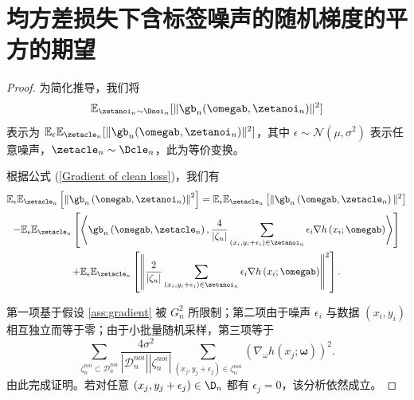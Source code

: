 \section{均方差损失下含标签噪声的随机梯度的平方的期望}\label{app:pro2}
\begin{proof}
为简化推导，我们将
$$
\mathbb{E}_{\zetanoi_n\sim \Dnoi_n}[\Vert \gb_n(\omegab, \zetanoi_n) \Vert^2]
$$
表示为 $\mathbb{E}_\epsilon\mathbb{E}_{\zetacle_n}[\Vert \gb_n(\omegab, \zetanoi_n) \Vert^2]$，其中 $\epsilon\sim \mathcal{N}(\mu, \sigma^2)$ 表示任意噪声，$\zetacle_n\sim\Dcle_n$，此为等价变换。

根据公式 (\ref{Gradient of clean loss})，我们有
\begin{multline}\label{eq:proof-s1}
\mathbb{E}_\epsilon\mathbb{E}_{\zetacle_n}\left[\left\Vert \gb_n\left(\omegab, \zetanoi_n\right) \right\Vert^2\right] 
= \mathbb{E}_\epsilon\mathbb{E}_{\zetacle_n}\left[\Vert\gb_n\left(\omegab,\zetacle_n\right)\Vert^2\right] \\
-\mathbb{E}_\epsilon\mathbb{E}_{\zetacle_n}\left[\left\langle\gb_n\left(\omegab,\zetacle_n\right),\frac{4}{|\zeta_n|}\sum_{\left(x_i,y_i+\epsilon_i\right)\in \zetanoi_n}\epsilon_i\nabla h\left(x_{i};\omegab\right)\right\rangle\right]\\
+\mathbb{E}_\epsilon\mathbb{E}_{\zetacle_n}\left[\left\Vert \frac{2}{|\zeta_n|}\sum_{\left(x_i,y_i+\epsilon_i\right)\in \zetanoi_n}\epsilon_i\nabla h\left(x_{i};\omegab\right)\right\Vert^2\right].
\end{multline}

第一项基于假设 \ref{ass:gradient} 被 $G_n^2$ 所限制；第二项由于噪声 $\epsilon_i$ 与数据 $(x_i,y_i)$ 相互独立而等于零；由于小批量随机采样，第三项等于
$$
\sum_{\zeta_n^{noi}\subset\mathcal{D}_n^{noi}} \frac{4\sigma^2}{|\mathcal{D}_n^{noi}||\zeta_n^{noi}|}\sum_{\left(x_{j},y_{j}+\epsilon_{j}\right)\in \zeta_n^{noi}}\left(\nabla_\omega  h\left(x_{j};\boldsymbol{\omega}\right)\right)^2.
$$
由此完成证明。若对任意 $\left(x_j,y_j+\epsilon_j\right)\in\D_n$ 都有 $\epsilon_j=0$，该分析依然成立。
\end{proof}